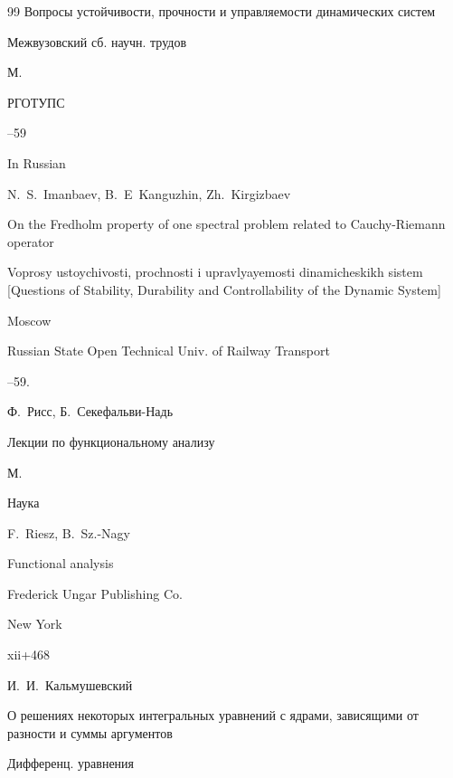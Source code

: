 \begin{thebibliography}{99}
\inbook Вопросы устойчивости,  прочности и управляемости динамических систем

\bookinfo Межвузовский сб. научн. трудов

\publaddr М.

\publ РГОТУПС


--59

\misctransl

\lang In Russian

\by N.~S.~Imanbaev, B.~E~Kanguzhin, Zh.~Kirgizbaev

\paper On the Fredholm property of one spectral problem related to Cauchy-Riemann operator

\inbook Voprosy ustoychivosti, prochnosti i upravlyayemosti dinamicheskikh sistem \rm [Questions of Stability, Durability and Controllability of the Dynamic System]

\publaddr Moscow

\publ Russian State Open Technical Univ. of Railway Transport


--59.




\by Ф.~Рисс, Б.~Секефальви-Надь

\book Лекции по функциональному анализу

\publaddr М.

\publ Наука



\transl

\by F.~Riesz, B.~Sz.-Nagy

\book Functional analysis

\publ Frederick Ungar Publishing Co.

\publaddr New York


\totalpages 

xii+468








\by И.~И.~Кальмушевский

\paper О решениях некоторых интегральных уравнений с ядрами, зависящими от разности и суммы аргументов

\jour Дифференц. уравнения


\end{thebibliography}
